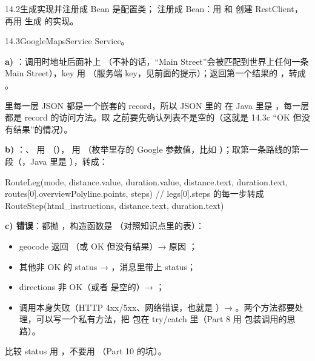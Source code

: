 \begin{task}{14.2\quad 生成实现并注册成 Bean}
 是配置类； 注册成 Bean：用  和  创建 RestClient，再用  生成  的实现。
\end{task}

\begin{task}{14.3\quad GoogleMapsService}
Service。

\textbf{a) }：调用时地址后面补上 （不补的话，“Main Street”会被匹配到世界上任何一条 Main Street），key 用 （服务端 key，见前面的提示）；返回第一个结果的 ，转成 。

\begin{note}
 里每一层 JSON 都是一个嵌套的 record，所以 JSON 里的  在 Java 里是 ，每一层都是 record 的访问方法。取  之前要先确认列表不是空的（这就是 14.3c “OK 但没有结果”的情况）。
\end{note}

\textbf{b) }：、 用 （）， 用 （枚举里存的 Google 参数值，比如 ）；取第一条路线的第一段（，Java 里是 ），转成：

\begin{plaincode}
RouteLeg(mode, distance.value, duration.value, distance.text, duration.text,
         routes[0].overviewPolyline.points,
         steps)   // legs[0].steps 的每一步转成 RouteStep(html_instructions, distance.text, duration.text)
\end{plaincode}

\textbf{c) 错误}：都抛 ，构造函数是 （对照知识点里的表）：
\begin{itemize}
  \item geocode 返回 （或 OK 但没有结果）→ 原因 ；
  \item 其他非 OK 的 status → ，消息里带上 status；
  \item directions 非 OK（或者  是空的）→ ；
  \item 调用本身失败（HTTP 4xx/5xx、网络错误，也就是 ）→ 。两个方法都要处理，可以写一个私有方法，把  包在 try/catch 里（Part 8 用  包装调用的思路）。
\end{itemize}
比较 status 用 ，不要用 \code{==}（Part 10 的坑）。
\end{task}

